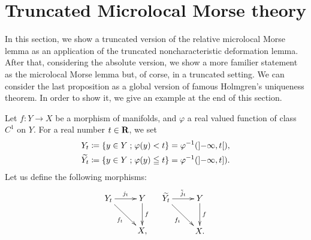 \section{Truncated Microlocal Morse theory}\label{sec:t-morse}

In this section, we show a truncated version of 
the relative microlocal Morse lemma as an application of the 
truncated noncharacteristic deformation lemma. 
After that, considering the absolute version, 
we show a more familier statement 
as the microlocal Morse lemma but, of corse, 
in a truncated setting. 
We can consider the last proposition as a global version 
of famous Holmgren's uniqueness theorem. 
In order to show it, we give an example at the end of 
this section.

Let \(f\colon Y\to X\) be a morphism of manifolds, and 
\(\varphi\) a real valued function of class \(C^1\) on \(Y\). 
For a real number \(t\in \mathbf{R}\), we set 
\begin{align*}
  Y_t
  &\coloneqq \left\{y\in Y\mathrel{;} \varphi(y)< t\right\} 
  = \varphi^{-1}(\left]-\infty,t\right[),\\
  \widetilde{Y_t}
  &\coloneqq \left\{y\in Y\mathrel{;} \varphi(y)\leqq t\right\} 
  = \varphi^{-1}(\left]-\infty,t\right]).
\end{align*}
Let us define the following morphisms:
\[\xymatrix{
  Y_t\ar[r]^-{j_t}
  \ar[rd]_-{f_t}
  &
  Y
  \ar[d]^-{f}\\
  &X,
}\quad\xymatrix{
  \widetilde{Y_t}\ar[r]^-{\tilde{j}_t}
  \ar[rd]_-{f_t}
  &
  Y
  \ar[d]^-{f}\\
  &X.
}\]

